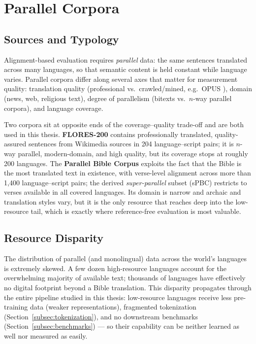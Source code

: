 \section{Parallel Corpora}
\label{sec:parallel-corpora}

\subsection{Sources and Typology}
\label{subsec:corpora-sources}

Alignment-based evaluation requires \emph{parallel} data: the same
sentences translated across many languages, so that semantic content is
held constant while language varies. Parallel corpora differ along
several axes that matter for measurement quality: translation quality
(professional vs.\ crawled/mined, e.g.\ OPUS \citep{tiedemann2012opus}),
domain (news, web, religious text), degree of parallelism (bitexts vs.\
$n$-way parallel corpora), and language coverage.

Two corpora sit at opposite ends of the coverage--quality trade-off and
are both used in this thesis. \textbf{FLORES-200} \citep{nllbteam2022}
contains professionally translated, quality-assured sentences from
Wikimedia sources in 204 language--script pairs; it is $n$-way parallel,
modern-domain, and high quality, but its coverage stops at roughly 200
languages. The \textbf{Parallel Bible Corpus} \citep{mayer2014bible}
exploits the fact that the Bible is the most translated text in existence,
with verse-level alignment across more than 1{,}400 language--script
pairs; the derived \emph{super-parallel} subset (sPBC) restricts to verses
available in all covered languages. Its domain is narrow and archaic and
translation styles vary, but it is the only resource that reaches deep
into the low-resource tail, which is exactly where reference-free
evaluation is most valuable.

\subsection{Resource Disparity}
\label{subsec:resource-disparity}

The distribution of parallel (and monolingual) data across the world's
languages is extremely skewed. A few dozen high-resource languages account
for the overwhelming majority of available text; thousands of languages
have effectively no digital footprint beyond a Bible translation. This
disparity propagates through the entire pipeline studied in this thesis:
low-resource languages receive less pre-training data (weaker
representations), fragmented tokenization
(Section~\ref{subsec:tokenization}), and no downstream benchmarks
(Section~\ref{subsec:benchmarks}) --- so their capability can be neither
learned as well nor measured as easily.


